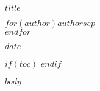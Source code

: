 \documentclass[11pt,oneside]{book}
\begin{document}
\begin{titlepage}
\centering
\vspace*{2cm}
{\Huge\bfseries $title$\par}
\vspace{1.5cm}
{\Large $for(author)$$author$$sep$ \\ $endfor$\par}
\vspace{1cm}
{\large $date$\par}
\vfill
\end{titlepage}

$if(toc)$
\tableofcontents
\clearpage
$endif$

$body$
\end{document}
